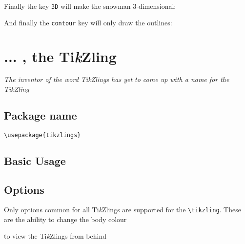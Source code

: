 \documentclass[parskip=half]{scrartcl}
\newcommand{\tikzlings}{Ti\emph{k}Zlings\xspace}
\begin{document}
Finally the key \lstinline|3D| will make the snowman 3-dimensional:
\begin{tcblisting}{}
\snowman[3D]
\end{tcblisting}

And finally the \lstinline|contour| key will only draw the outlines:
\begin{tcblisting}{}
\snowman[contour=black]
\end{tcblisting}

%
%
\clearpage
\section[Ti\emph{k}Zling]{... , the Ti\emph{k}Zling}

\emph{The inventor of the word \tikzlings has yet to come up with a name for the Ti\emph{k}Zling}

\subsection{Package name}

\begin{tcolorbox}[lower separated=false, lefthand width=.8\linewidth]
\vspace*{0.5cm}
\lstinline|\usepackage{tikzlings}|
\vspace*{0.5cm}
\end{tcolorbox}

\subsection{Basic Usage}

\begin{tcblisting}{}
\tikzling
\end{tcblisting}

\subsection{Options}

Only options common for all \tikzlings are supported for the \lstinline|\tikzling|. These are the ability to change the body colour
\begin{tcblisting}{}
\tikzling[body=blue]
\end{tcblisting}

to view the \tikzlings from behind
\begin{tcblisting}{}
\tikzling[back]
\end{tcblisting}
\end{document}
